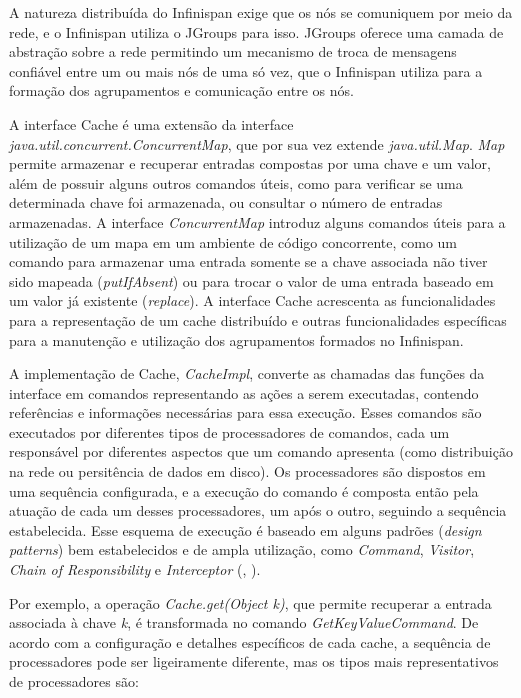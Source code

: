 \documentclass[11pt,twoside,a4paper]{book}
\begin{document}
A natureza distribuída do Infinispan exige que os nós se comuniquem por meio da rede, e o Infinispan utiliza o JGroups \cite{jgroups} para isso. JGroups oferece uma camada de abstração sobre a rede permitindo um mecanismo de troca de mensagens confiável entre um ou mais nós de uma só vez, que o Infinispan utiliza para a formação dos agrupamentos e comunicação entre os nós.

A interface Cache é uma extensão da interface \emph{java.util.concurrent.ConcurrentMap}, que por sua vez extende \emph{java.util.Map}. \emph{Map} permite armazenar e recuperar entradas compostas por uma chave e um valor, além de possuir alguns outros comandos úteis, como para verificar se uma determinada chave foi armazenada, ou consultar o número de entradas armazenadas. A interface \emph{ConcurrentMap} introduz alguns comandos úteis para a utilização de um mapa em um ambiente de código concorrente, como um comando para armazenar uma entrada somente se a chave associada não tiver sido mapeada (\emph{putIfAbsent}) ou para trocar o valor de uma entrada baseado em um valor já existente (\emph{replace}). A interface Cache acrescenta as funcionalidades para a representação de um cache distribuído e outras funcionalidades específicas para a manutenção e utilização dos agrupamentos formados no Infinispan.

A implementação de Cache, \emph{CacheImpl}, converte as chamadas das funções da interface em comandos representando as ações a serem executadas, contendo referências e informações necessárias para essa execução. Esses comandos são executados por diferentes tipos de processadores de comandos, cada um responsável por diferentes aspectos que um comando apresenta (como distribuição na rede ou persitência de dados em disco). Os processadores são dispostos em uma sequência configurada, e a execução do comando é composta então pela atuação de cada um desses processadores, um após o outro, seguindo a sequência estabelecida. Esse esquema de execução é baseado em alguns padrões (\emph{design patterns}) bem estabelecidos e de ampla utilização, como \emph{Command}, \emph{Visitor}, \emph{Chain of Responsibility} e \emph{Interceptor} (\cite{design_patterns}, \cite{posa}).

Por exemplo, a operação \emph{Cache.get(Object k)}, que permite recuperar a entrada associada à chave \emph{k}, é transformada no comando \emph{GetKeyValueCommand}. De acordo com a configuração e detalhes específicos de cada cache, a sequência de processadores pode ser ligeiramente diferente, mas os tipos mais representativos de processadores são:
\end{document}
